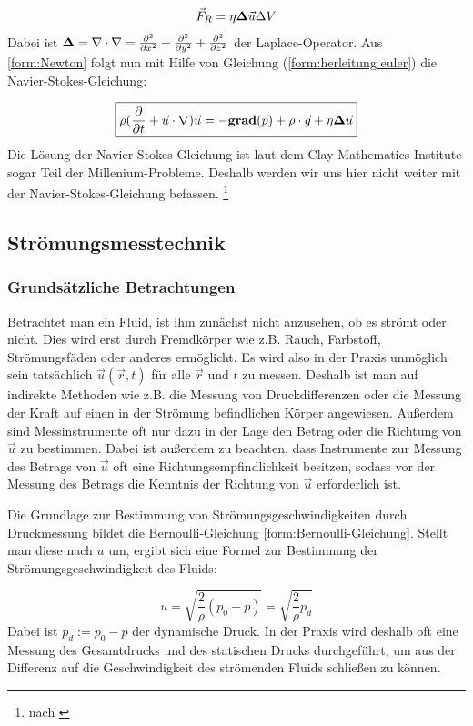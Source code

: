 \begin{equation}
\vec{F}_R = \eta {\bf \Delta} \vec{u} \Delta V
\end{equation}
Dabei ist $ {\bf \Delta} = \nabla \cdot \nabla = \frac{\partial^2}{\partial x^2} + \frac{\partial^2}{\partial y^2} + \frac{\partial^2}{\partial z^2} $ der Laplace-Operator. Aus \ref{form:Newton} folgt nun mit Hilfe von Gleichung (\ref{form:herleitung euler}) die Navier-Stokes-Gleichung:

\begin{equation}
\boxed{\rho (\frac{\partial}{\partial t} + \vec{u} \cdot \nabla ) \vec{u} = - {\bf grad}(p) + \rho \cdot \vec{g} + \eta {\bf \Delta} \vec{u}}
\end{equation}
Die Lösung der Navier-Stokes-Gleichung ist laut dem Clay Mathematics Institute sogar Teil der Millenium-Probleme. Deshalb werden wir uns hier nicht weiter mit der Navier-Stokes-Gleichung befassen. \footnote{nach \cite[212ff.]{troeder}}

\subsection{Strömungsmesstechnik}
\subsubsection{Grundsätzliche Betrachtungen}
Betrachtet man ein Fluid, ist ihm zunächst nicht anzusehen, ob es strömt oder nicht. Dies wird erst durch Fremdkörper wie z.B. Rauch, Farbstoff, Strömungsfäden oder anderes ermöglicht. Es wird also in der Praxis unmöglich sein tatsächlich $ \vec{u} ( \vec{r} , t) $ für alle $ \vec{r} $ und $t$ zu messen. Deshalb ist man auf indirekte Methoden wie z.B. die  Messung von Druckdifferenzen oder die Messung der Kraft auf einen in der Strömung befindlichen Körper angewiesen. Außerdem sind Messinstrumente oft nur dazu in der Lage den Betrag oder die Richtung von $ \vec{u} $ zu bestimmen. Dabei ist außerdem zu beachten, dass Instrumente zur Messung des Betrags von $ \vec{u} $ oft eine Richtungsempfindlichkeit besitzen, sodass vor der Messung des Betrags die Kenntnis der Richtung von $ \vec{u} $ erforderlich ist.

Die Grundlage zur Bestimmung von Strömungsgeschwindigkeiten durch Druckmessung bildet die Bernoulli-Gleichung \ref{form:Bernoulli-Gleichung}. Stellt man diese nach $u$ um, ergibt sich eine Formel zur Bestimmung der Strömungsgeschwindigkeit des Fluids:

\begin{equation}
\boxed{u = \sqrt{\frac{2}{\rho} (p_0 - p)} = \sqrt{\frac{2}{\rho} p_d}}
\label{eq:Geschwindigkeitsformel}
\end{equation} 
Dabei ist $ p_d := p_0 - p $ der dynamische Druck. In der Praxis wird deshalb oft eine Messung des Gesamtdrucks und des statischen Drucks durchgeführt, um aus der Differenz auf die Geschwindigkeit des strömenden Fluids schließen zu können.

